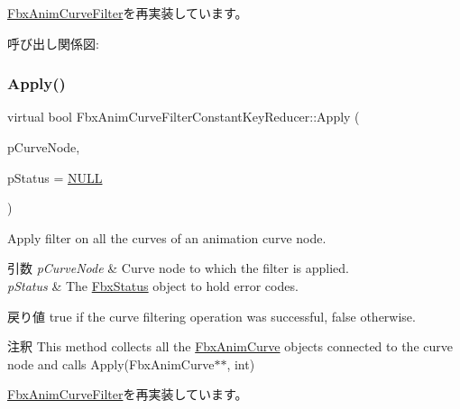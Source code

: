 \hyperlink{class_fbx_anim_curve_filter_aca6a41fbc4d9019b20df7adccfa6ed3c}{Fbx\+Anim\+Curve\+Filter}を再実装しています。

呼び出し関係図\+:
\mbox{\label{class_fbx_anim_curve_filter_constant_key_reducer_a54f43929707bc95bc5d0830ec039fde2}} 
\subsubsection{\texorpdfstring{Apply()}{Apply()}\hspace{0.1cm}{\footnotesize\ttfamily [4/5]}}
{\footnotesize\ttfamily virtual bool Fbx\+Anim\+Curve\+Filter\+Constant\+Key\+Reducer\+::\+Apply (\begin{DoxyParamCaption}\item[{\hyperlink{class_fbx_anim_curve_node}{Fbx\+Anim\+Curve\+Node} \&}]{p\+Curve\+Node,  }\item[{\hyperlink{class_fbx_status}{Fbx\+Status} $\ast$}]{p\+Status = {\ttfamily \hyperlink{fbxarch_8h_a070d2ce7b6bb7e5c05602aa8c308d0c4}{N\+U\+LL}} }\end{DoxyParamCaption})\hspace{0.3cm}{\ttfamily [virtual]}}

Apply filter on all the curves of an animation curve node. 
\begin{DoxyParams}{引数}
{\em p\+Curve\+Node} & Curve node to which the filter is applied. \\
\hline
{\em p\+Status} & The \hyperlink{class_fbx_status}{Fbx\+Status} object to hold error codes. \\
\hline
\end{DoxyParams}
\begin{DoxyReturn}{戻り値}
{\ttfamily true} if the curve filtering operation was successful, {\ttfamily false} otherwise. 
\end{DoxyReturn}
\begin{DoxyRemark}{注釈}
This method collects all the \hyperlink{class_fbx_anim_curve}{Fbx\+Anim\+Curve} objects connected to the curve node and calls Apply(\+Fbx\+Anim\+Curve$\ast$$\ast$, int) 
\end{DoxyRemark}


\hyperlink{class_fbx_anim_curve_filter_ad042b45c0675278fa49e61739b0825c2}{Fbx\+Anim\+Curve\+Filter}を再実装しています。

